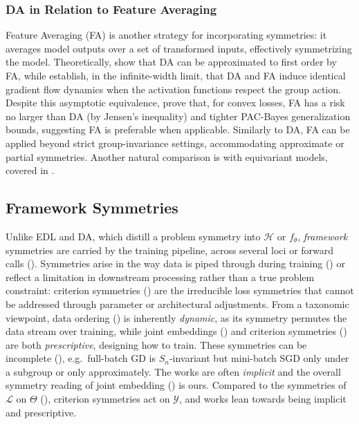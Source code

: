 \documentclass[mathematics,review,submit,moreauthors]{Definitions/mdpi}
\begin{document}
\subsubsection{DA in Relation to Feature Averaging}\label{sec:da-fa}
Feature Averaging (FA) is another strategy for incorporating symmetries: it averages model outputs over a set of transformed inputs, effectively symmetrizing the model.
Theoretically, \citet{dao2019p3icml} show that DA can be approximated to first order by FA, while \citet{maass2024} establish, in the infinite-width limit, that DA and FA induce identical gradient flow dynamics when the activation functions respect the group action.
Despite this asymptotic equivalence, \citet{lyle2020} prove that, for convex losses, FA has a risk no larger than DA (by Jensen's inequality) and tighter PAC-Bayes generalization bounds, suggesting FA is preferable when applicable.
Similarly to DA, FA can be applied beyond strict group-invariance settings, accommodating approximate or partial symmetries.
Another natural comparison is with equivariant models, covered in .

\subsection{Framework Symmetries}\label{sec:framework-symmetries}
Unlike EDL and DA, which distill a problem symmetry into $\mathcal{H}$ or $f_\theta$, \emph{framework} symmetries are carried by the training pipeline, across several loci or forward calls ().
Symmetries arise in the way data is piped through during training () or reflect a limitation in downstream processing rather than a true problem constraint: criterion symmetries () are the irreducible loss symmetries that cannot be addressed through parameter or architectural adjustments.
From a taxonomic viewpoint, data ordering () is inherently \emph{dynamic}, as its symmetry permutes the data stream over training, while joint embeddings () and criterion symmetries () are both \emph{prescriptive}, designing how to train.
These symmetries can be incomplete (), e.g.\ full-batch GD is $S_n$-invariant but mini-batch SGD only under a subgroup or only approximately. The works are often \emph{implicit} and the overall symmetry reading of joint embedding () is ours.
Compared to the symmetries of $\mathcal{L}$ on $\Theta$ (), criterion symmetries act on $\mathcal{Y}$, and works lean towards being implicit and prescriptive.
\end{document}
